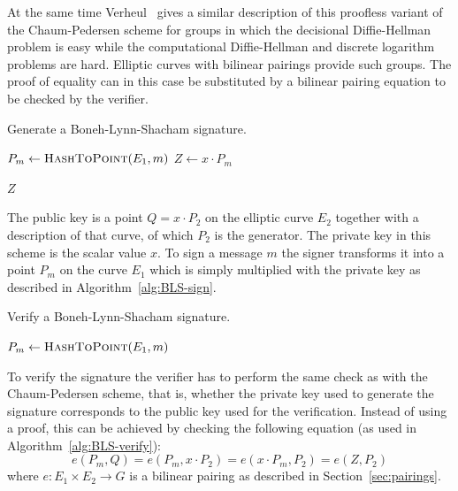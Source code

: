 At the same time Verheul~\cite{Verheul01} gives a similar description of this
proofless variant  of the Chaum-Pedersen scheme for groups in which the
decisional Diffie-Hellman problem is easy while the computational Diffie-Hellman
and discrete logarithm problems are hard. Elliptic curves with bilinear pairings
provide such groups. The proof of equality can in this case be substituted by a
bilinear pairing equation to be checked by the verifier.

\begin{algorithm}[t]
  \caption{Generate a Boneh-Lynn-Shacham signature.}
  \label{alg:BLS-sign}
  \addtolength{\baselineskip}{1mm}
  \begin{algorithmic}[1]
      \State $P_m \gets \Call{HashToPoint}{E_1, m}$
      \State $Z \gets x \cdot P_m$

      \Return $Z$
    \EndFunction
  \end{algorithmic}
\end{algorithm}

The public key is a point $Q = x \cdot P_2$ on the elliptic curve $E_2$
together with a description of that curve, of which $P_2$ is the generator. The
private key in this scheme is the scalar value $x$. To sign a message $m$ the
signer transforms it into a point $P_m$ on the curve $E_1$ which is simply
multiplied with the private key as described in Algorithm~\ref{alg:BLS-sign}.

\begin{algorithm}
  \caption{Verify a Boneh-Lynn-Shacham signature.}
  \label{alg:BLS-verify}
  \addtolength{\baselineskip}{1mm}
  \begin{algorithmic}[1]
      \State $P_m \gets \Call{HashToPoint}{E_1, m}$
      \Return {}
      \EndIf

      \Return {}
    \EndFunction
  \end{algorithmic}
\end{algorithm}

To verify the signature the verifier has to perform the same check as with the
Chaum-Pedersen scheme, that is, whether the private key used to generate the
signature corresponds to the public key used for the verification. Instead of
using a proof, this can be achieved by checking the following equation (as used
in Algorithm~\ref{alg:BLS-verify}):
\begin{equation}\label{eqn:BLS-verify}
  e(P_m, Q) = e(P_m, x \cdot P_2) = e(x \cdot P_m, P_2) = e(Z, P_2)
\end{equation}
where $e: E_1 \times E_2 \to G$ is a bilinear pairing as described in
Section~\ref{sec:pairings}.

